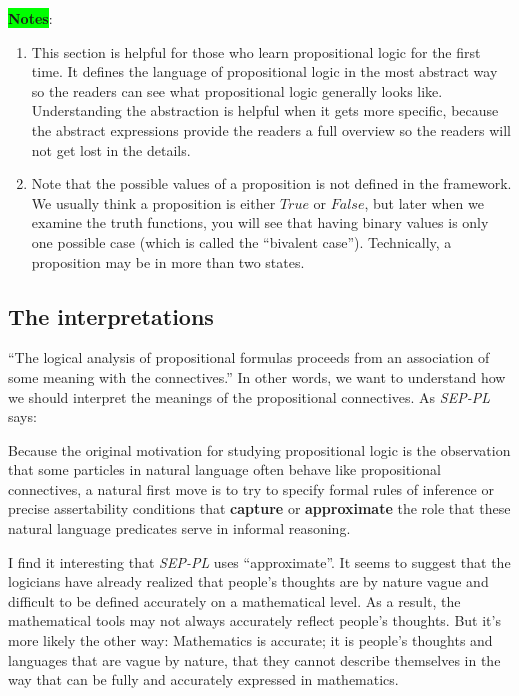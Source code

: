 \documentclass[12pt, letterpaper]{article}
\begin{document}
\colorbox{lime}{\textbf{Notes}}:
\begin{enumerate}
  \item This section is helpful for those who learn propositional logic for the
    first time. It defines the language of propositional logic in the most
    abstract way so the readers can see what propositional logic generally
    looks like. Understanding the abstraction is helpful when it gets more
    specific, because the abstract expressions provide the readers a full
    overview so the readers will not get lost in the details.
  \item Note that the possible values of a proposition is not defined in the
    framework. We usually think a proposition is either $True$ or $False$, but
    later when we examine the truth functions, you will see that having binary
    values is only one possible case (which is called the ``bivalent case'').
    Technically, a proposition may be in more than two states.
\end{enumerate}

\subsection{The interpretations}

``The logical analysis of propositional formulas proceeds from an association
of some meaning with the connectives.'' In other words, we want to understand
how we should interpret the meanings of the propositional connectives. As
\textit{SEP-PL} says:

\begin{displayquote}
  Because the original motivation for studying propositional logic is the
  observation that some particles in natural language often behave like
  propositional connectives, a natural first move is to try to specify formal
  rules of inference or precise assertability conditions that \textbf{capture}
  or \textbf{approximate} the role that these natural language predicates serve
  in informal reasoning.
\end{displayquote}

I find it interesting that \textit{SEP-PL} uses ``approximate''. It seems to
suggest that the logicians have already realized that people's thoughts are
by nature vague and difficult to be defined accurately on a mathematical level.
As a result, the mathematical tools may not always accurately reflect people's
thoughts. But it's more likely the other way: Mathematics is accurate; it is
people's thoughts and languages that are vague by nature, that they cannot
describe themselves in the way that can be fully and accurately expressed in
mathematics.
\end{document}
